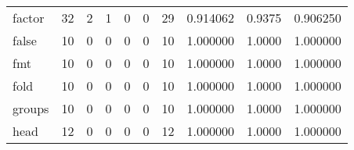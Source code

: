 \begin{tabular}{lrrrrrrrrr}
factor    &                                       32 &                                                  2 &                                                  1 &                                                  0 &                                                  0 &                                                 29 &                                           0.914062 &                                 0.9375 &                             0.906250 \\
false     &                                       10 &                                                  0 &                                                  0 &                                                  0 &                                                  0 &                                                 10 &                                           1.000000 &                                 1.0000 &                             1.000000 \\
fmt       &                                       10 &                                                  0 &                                                  0 &                                                  0 &                                                  0 &                                                 10 &                                           1.000000 &                                 1.0000 &                             1.000000 \\
fold      &                                       10 &                                                  0 &                                                  0 &                                                  0 &                                                  0 &                                                 10 &                                           1.000000 &                                 1.0000 &                             1.000000 \\
groups    &                                       10 &                                                  0 &                                                  0 &                                                  0 &                                                  0 &                                                 10 &                                           1.000000 &                                 1.0000 &                             1.000000 \\
head      &                                       12 &                                                  0 &                                                  0 &                                                  0 &                                                  0 &                                                 12 &                                           1.000000 &                                 1.0000 &                             1.000000 \\

\end{tabular}
